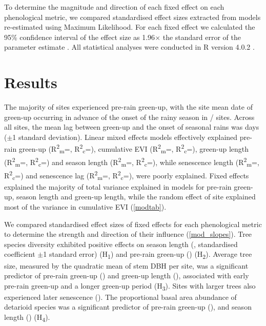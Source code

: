 \documentclass[11pt,a4paper]{article}
\begin{document}
To determine the magnitude and direction of each fixed effect on each
phenological metric, we compared standardised effect sizes extracted from
models re-estimated using Maximum Likelihood. For each fixed effect we
calculated the 95\% confidence interval of the effect size as 1.96$\times{}$
the standard error of the parameter estimate \citep{Zuur2010}. All statistical
analyses were conducted in R version 4.0.2 \citep{R2020}.

\section{Results}

The majority of sites experienced pre-rain green-up, with the site mean date of
green-up occurring in advance of the onset of the rainy season in
\posGreAll{}/\nSites{} sites. Across all sites, the mean lag between green-up
and the onset of seasonal rains was \greenLagMean{} days ($\pm{}$1 standard
deviation). Linear mixed effects models effectively explained 
pre-rain green-up (R\textsuperscript{2}\textsubscript{m}=\glagRm{},
R\textsuperscript{2}\textsubscript{c}=\glagRc{}), 
cumulative EVI (R\textsuperscript{2}\textsubscript{m}=\cumviRm{},
R\textsuperscript{2}\textsubscript{c}=\cumviRc{}), 
green-up length (R\textsuperscript{2}\textsubscript{m}=\grateRm{},
R\textsuperscript{2}\textsubscript{c}=\grateRc{}) and 
season length (R\textsuperscript{2}\textsubscript{m}=\lengthRm{},
R\textsuperscript{2}\textsubscript{c}=\lengthRc{}), while 
senescence length (R\textsuperscript{2}\textsubscript{m}=\srateRm{},
R\textsuperscript{2}\textsubscript{c}=\srateRc{}) and 
senescence lag (R\textsuperscript{2}\textsubscript{m}=\slagRm{},
R\textsuperscript{2}\textsubscript{c}=\slagRc{}), were poorly explained. Fixed
effects explained the majority of total variance explained in models for
pre-rain green-up, season length and green-up length, while the random effect
of site explained most of the variance in cumulative EVI (\autoref{modtab}).

We compared standardised effect sizes of fixed effects for each phenological
metric to determine the strength and direction of their influence
(\autoref{mod_slopes}). Tree species diversity exhibited positive
effects on season length (\slRich{}, standardised coefficient $\pm$1 standard
error) (H\textsubscript{1}) and pre-rain green-up (\prRich{})
(H\textsubscript{2}). Average tree size, measured by the quadratic mean of stem
DBH per site, was a significant predictor of pre-rain green-up (\prSize{}) and
green-up length (\glSize{}), associated with early pre-rain green-up and a
longer green-up period (H\textsubscript{3}). Sites with larger trees also
experienced later senescence (\slSize{}). The proportional basal area abundance
of detarioid species was a significant predictor of pre-rain green-up
(\prDet{}), and season length (\slDet{}) (H\textsubscript{4}). 
\end{document}
